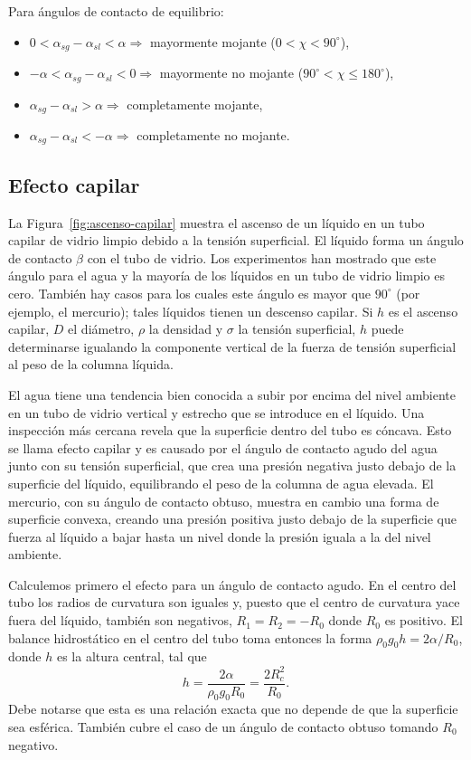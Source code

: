 \figuraBalanceYoung

Para ángulos de contacto de equilibrio:
\begin{itemize}
\item $0 < \alpha_{sg} - \alpha_{sl} < \alpha \Rightarrow$ mayormente mojante ($0 < \chi < 90^\circ$),
\item $-\alpha < \alpha_{sg} - \alpha_{sl} < 0 \Rightarrow$ mayormente no mojante ($90^\circ < \chi \le 180^\circ$),
\item $\alpha_{sg} - \alpha_{sl} > \alpha \Rightarrow$ completamente mojante,
\item $\alpha_{sg} - \alpha_{sl} < -\alpha \Rightarrow$ completamente no mojante.
\end{itemize}

\subsection{Efecto capilar}

\figuraAscensoCapilar

La Figura~\ref{fig:ascenso-capilar} muestra el ascenso de un líquido en un tubo capilar de vidrio limpio debido a la tensión superficial. El líquido forma un ángulo de contacto $\beta$ con el tubo de vidrio. Los experimentos han mostrado que este ángulo para el agua y la mayoría de los líquidos en un tubo de vidrio limpio es cero. También hay casos para los cuales este ángulo es mayor que $90^\circ$ (por ejemplo, el mercurio); tales líquidos tienen un descenso capilar. Si $h$ es el ascenso capilar, $D$ el diámetro, $\rho$ la densidad y $\sigma$ la tensión superficial, $h$ puede determinarse igualando la componente vertical de la fuerza de tensión superficial al peso de la columna líquida.

El agua tiene una tendencia bien conocida a subir por encima del nivel ambiente en un tubo de vidrio vertical y estrecho que se introduce en el líquido. Una inspección más cercana revela que la superficie dentro del tubo es cóncava. Esto se llama efecto capilar y es causado por el ángulo de contacto agudo del agua junto con su tensión superficial, que crea una presión negativa justo debajo de la superficie del líquido, equilibrando el peso de la columna de agua elevada. El mercurio, con su ángulo de contacto obtuso, muestra en cambio una forma de superficie convexa, creando una presión positiva justo debajo de la superficie que fuerza al líquido a bajar hasta un nivel donde la presión iguala a la del nivel ambiente.

Calculemos primero el efecto para un ángulo de contacto agudo. En el centro del tubo los radios de curvatura son iguales y, puesto que el centro de curvatura yace fuera del líquido, también son negativos, $R_1 = R_2 = -R_0$ donde $R_0$ es positivo. El balance hidrostático en el centro del tubo toma entonces la forma $\rho_0 g_0 h = 2\alpha/R_0$, donde $h$ es la altura central, tal que
$$ h = \frac{2\alpha}{\rho_0 g_0 R_0} = \frac{2R_c^2}{R_0}. $$
Debe notarse que esta es una relación exacta que no depende de que la superficie sea esférica. También cubre el caso de un ángulo de contacto obtuso tomando $R_0$ negativo.

